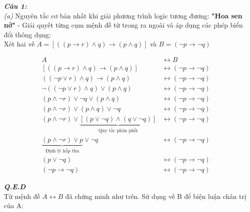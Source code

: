 \documentclass[a4paper]{exam}
\begin{document}
	\pagebreak
	
	\textit{\textbf{Câu 1:}}\\
	
	
	\textit{(a)} Nguyên tắc cơ bản nhất khi giải phương trình logic tương đương: \textbf{"Hoa sen nở"} - Giải quyết từng cụm mệnh đề từ trong ra ngoài và áp dụng các phép biển đổi thông dụng:\\
	
	Xét hai vế $A = \left[((p \longrightarrow r) \land q) \longrightarrow (p \land q) \right]$ và $B = (\neg p \longrightarrow \neg q)$
	
	\begin{equation*}
		\begin{aligned}
			A &\longleftrightarrow B \\
			\left[((p \longrightarrow r) \land q) \longrightarrow (p \land q) \right] 
			&\longleftrightarrow (\neg p \longrightarrow \neg q) \\ 
			((\neg p \lor r ) \land q) \longrightarrow (p \land q) 
			&\longleftrightarrow (\neg p \longrightarrow \neg q) \\ 
			\neg ((\neg p \lor r) \land q) \lor (p \land q) 
			&\longleftrightarrow (\neg p \longrightarrow \neg q) \\ 
			(p \land \neg r) \lor \neg q \lor (p \land q) 
			&\longleftrightarrow (\neg p \longrightarrow \neg q) \\ 
			(p \land \neg r) \lor (p \land q) \lor \neg q 
			&\longleftrightarrow (\neg p \longrightarrow \neg q) \\ 
			(p \land \neg r) \lor \underbrace{\left[(p \lor \neg q) \land (q \lor \neg q)\right]}_\textrm{Quy tắc phân phối}
			&\longleftrightarrow (\neg p \longrightarrow \neg q) \\ 
			\underbrace{(p \land \neg r) \lor p}_\textrm{Định lý hấp thu} \lor \neg q 
			&\longleftrightarrow (\neg p \longrightarrow \neg q) \\ 
			(p \lor \neg q) 
			&\longleftrightarrow (\neg p \longrightarrow \neg q) \\ 
			(\neg p \longrightarrow \neg q) 
			&\longleftrightarrow (\neg p \longrightarrow \neg q) 
		\end{aligned}
	\end{equation*}

	\hspace*{0pt}\hfill \textit{\textbf{Q.E.D}}\\
	
	Từ mệnh đề $A \longleftrightarrow B$ đã chứng minh như trên. Sử dụng vế B để biện luận chân trị của A:\\
	
\end{document}
